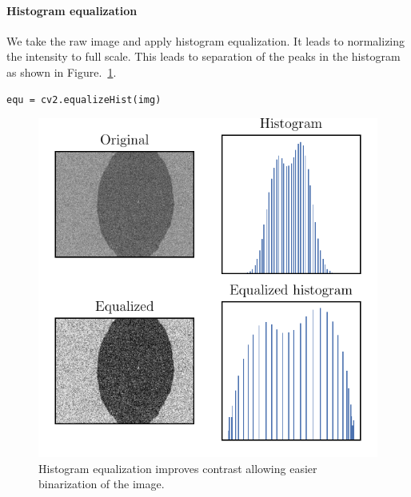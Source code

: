 \documentclass[12pt, twoside, a4paper]{article}
\begin{document}
\paragraph{Histogram equalization}
We take the raw image and apply histogram equalization. It leads to normalizing the intensity to full scale. This leads to separation of the peaks in the histogram as shown in Figure.~\ref{openCV histogram equalization}.
%
\begin{verbatim}
equ = cv2.equalizeHist(img)

\end{verbatim}
%
%
\begin{figure}[!htbp]
	\centering
	\includegraphics[scale=1.0]{figures/01_HistogramEqualizationEffect.pdf}
	\caption{Histogram equalization improves contrast allowing easier binarization of the image.
	}
	\label{openCV histogram equalization}
\end{figure}
%
\end{document}

